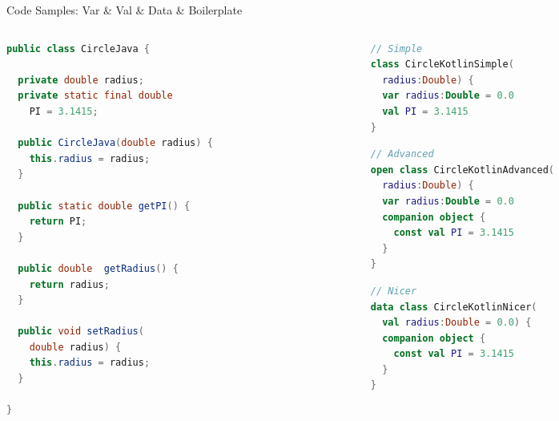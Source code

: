 \begin{frame}[fragile]{Code Samples: Var \& Val \& Data \& Boilerplate}
	\begin{columns}
		\begin{column}{0.5\textwidth}
\begin{lstlisting}[language=java,basicstyle=\ttfamily\scriptsize]
public class CircleJava {

  private double radius;
  private static final double
    PI = 3.1415;

  public CircleJava(double radius) {
    this.radius = radius;
  }

  public static double getPI() {
    return PI;
  }

  public double  getRadius() {
    return radius;
  }

  public void setRadius(
    double radius) {
    this.radius = radius;
  }

}
\end{lstlisting}
		\end{column}
		\begin{column}{0.5\textwidth}
\begin{lstlisting}[language=Kotlin,basicstyle=\ttfamily\scriptsize]
// Simple
class CircleKotlinSimple(
  radius:Double) {
  var radius:Double = 0.0
  val PI = 3.1415
}
\end{lstlisting}
\begin{lstlisting}[language=Kotlin,basicstyle=\ttfamily\scriptsize]
// Advanced
open class CircleKotlinAdvanced(
  radius:Double) {
  var radius:Double = 0.0
  companion object {
    const val PI = 3.1415
  }
}
\end{lstlisting}
\begin{lstlisting}[language=Kotlin,basicstyle=\ttfamily\scriptsize]
// Nicer
data class CircleKotlinNicer(
  val radius:Double = 0.0) {
  companion object {
    const val PI = 3.1415
  }
}
\end{lstlisting}
		\end{column}
	\end{columns}
\end{frame}

